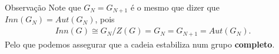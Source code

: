 \begin{frame}{}
\begin{block}{Observação}
    Note que $G_{N}=G_{N+1}$ é o mesmo que dizer que $Inn(G_N)=Aut(G_{N})$, pois
    \begin{align*}
      Inn(G)\cong G_N/Z(G)=G_N=G_{N+1}=Aut(G_N).
    \end{align*}
    Pelo que podemos assegurar que a cadeia estabiliza num grupo \textbf{completo}.
  \end{block}    
\end{frame}

